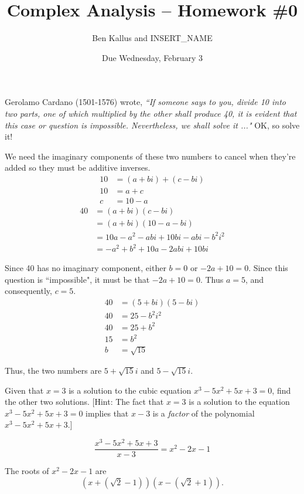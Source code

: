 \documentclass[11pt]{article}       %
\title{Complex Analysis -- Homework \#0}
\author{ Ben Kallus and INSERT\_NAME }
\date{ Due Wednesday, February 3 }
\theoremstyle{definition}
\begin{document}
\pagecolor{black}
\color{white}
\maketitle

  Gerolamo Cardano (1501-1576) wrote,
{\sl ``If someone says to you, divide 10 into two parts, one of which multiplied by the other shall produce 40, it is evident that this case or question is impossible. Nevertheless, we shall solve it ..."} \quad 
OK, so solve it!

    We need the imaginary components of these two numbers to cancel when they're added so they must be additive inverses.
    \begin{align*}
        10 &= (a+bi) + (c-bi) \\
        10 &= a + c \\
        c  &= 10 - a
    \end{align*}
    \begin{align*}
        40 &= (a+bi)(c-bi) \\
           &= (a+bi)(10-a-bi) \\
           &= 10a - a^2 - abi + 10bi - abi -b^2i^2 \\
           &= -a^2 + b^2 + 10a - 2abi + 10bi
    \end{align*}

    Since 40 has no imaginary component, either $b=0$ or $-2a+10=0$.
    Since this question is ``impossible", it must be that $-2a+10=0$.
    Thus $a=5$, and consequently, $c=5$.
    \begin{align*}
        40 &= (5+bi)(5-bi) \\
        40 &= 25 -b^2i^2 \\
        40 &= 25 + b^2 \\
        15 &= b^2 \\
        b  &= \sqrt{15}
    \end{align*}

    Thus, the two numbers are $5+\sqrt{15}i$ and $5-\sqrt{15}i$.

\newpage
{}  Given that $x=3$ is a solution to the cubic equation $x^3-5x^2+5x+3=0$, find the other two solutions. [{\sc Hint:} The fact that $x=3$ is a solution to the equation $x^3-5x^2+5x+3=0$ implies that $x-3$ is a \emph{factor} of the polynomial
$x^3-5x^2+5x+3$.]

    $$\frac{x^3-5x^2+5x+3}{x-3} = x^2-2x-1$$

    The roots of $x^2-2x-1$ are $$\left(x+\left(\sqrt{2}-1\right)\right)\left(x-\left(\sqrt{2}+1\right)\right).$$
\end{document}
